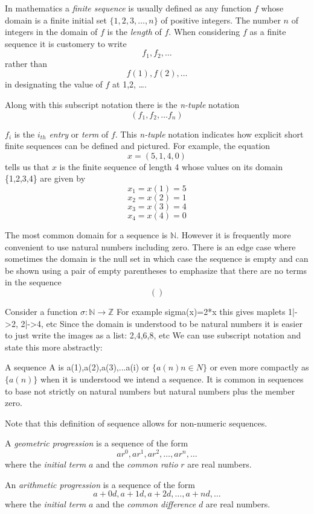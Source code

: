 In mathematics a \textit{finite sequence} is usually defined as any function $f$ whose domain is a finite initial set $\{1,2,3, \dots ,n\}$ of positive integers. The number $n$ of integers in the domain of $f$ is the \textit{length} of $f$. When considering $f$ as a finite sequence it is customery to write
$$f_1,f_2, \dots$$
rather than
$$f(1),f(2), \dots$$
in designating the value of $f$ at 1,2, \dots.

Along with this subscript notation there is the \textit{n-tuple} notation
$$(f_1,f_2, \dots f_n)$$


$f_i$ is the $i_{th}$ \textit{entry} or \textit{term} of $f$. This \textit{n-tuple} notation indicates how explicit short finite sequences can be defined and pictured. For example, the equation  
$$x=(5,1,4,0)$$
tells us that $x$ is the finite sequence of length 4 whose values on its domain \{1,2,3,4\} are given by
$$x_1=x(1)=5$$
$$x_2=x(2)=1$$
$$x_3=x(3)=4$$
$$x_4=x(4)=0$$

The most common domain for a sequence is $\mathbb{N}$. However it is frequently more convenient to use natural numbers including zero. There is an edge case where sometimes the domain is the null set in which case the sequence is empty and can be shown using a pair of empty parentheses to emphasize that there are no terms in the sequence
$$(  )$$

Consider a function $\sigma:\mathbb{N} \rightarrow \mathbb{Z}$
For example sigma(x)=2*x
this gives maplets 1|->2, 2|->4, etc
Since the domain is understood to be natural numbers it is easier to just write the images as a list:
2,4,6,8, etc
We can use subscript notation and state this more abstractly:

A sequence A is a(1),a(2),a(3),...a(i) 
or
$\{a(n) n \in N\}$  or even more compactly as $\{a(n)\}$ when it is understood we intend a sequence. It is common in sequences to base not strictly on natural numbers but natural numbers plus the member zero. 

Note that this definition of sequence allows for non-numeric sequences.



\begin{definition}
A \textit{geometric progression} is a sequence of the form
$$ar^0,ar^1,ar^2, \dots ,ar^n, \dots$$
where the \textit{initial term} $a$ and the \textit{common ratio} $r$ are real numbers.
\end{definition}

\begin{definition} 
An \textit{arithmetic progression} is a sequence of the form
$$a+0d,a+1d,a+2d, \dots ,a+nd, \dots$$
where the \textit{initial term} $a$ and the \textit{common difference} $d$ are real numbers.
\end{definition}



